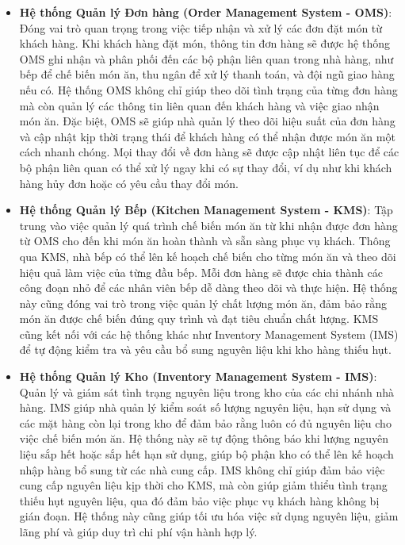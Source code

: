 \begin{itemize}
    \item \textbf{Hệ thống Quản lý Đơn hàng (Order Management System - OMS)}: Đóng vai trò quan trọng trong việc tiếp nhận và xử lý các đơn đặt món từ khách hàng. Khi khách hàng đặt món, thông tin đơn hàng sẽ được hệ thống OMS ghi nhận và phân phối đến các bộ phận liên quan trong nhà hàng, như bếp để chế biến món ăn, thu ngân để xử lý thanh toán, và đội ngũ giao hàng nếu có. Hệ thống OMS không chỉ giúp theo dõi tình trạng của từng đơn hàng mà còn quản lý các thông tin liên quan đến khách hàng và việc giao nhận món ăn. Đặc biệt, OMS sẽ giúp nhà quản lý theo dõi hiệu suất của đơn hàng và cập nhật kịp thời trạng thái để khách hàng có thể nhận được món ăn một cách nhanh chóng. Mọi thay đổi về đơn hàng sẽ được cập nhật liên tục để các bộ phận liên quan có thể xử lý ngay khi có sự thay đổi, ví dụ như khi khách hàng hủy đơn hoặc có yêu cầu thay đổi món.

    \item \textbf{Hệ thống Quản lý Bếp (Kitchen Management System - KMS)}: Tập trung vào việc quản lý quá trình chế biến món ăn từ khi nhận được đơn hàng từ OMS cho đến khi món ăn hoàn thành và sẵn sàng phục vụ khách. Thông qua KMS, nhà bếp có thể lên kế hoạch chế biến cho từng món ăn và theo dõi hiệu quả làm việc của từng đầu bếp. Mỗi đơn hàng sẽ được chia thành các công đoạn nhỏ để các nhân viên bếp dễ dàng theo dõi và thực hiện. Hệ thống này cũng đóng vai trò trong việc quản lý chất lượng món ăn, đảm bảo rằng món ăn được chế biến đúng quy trình và đạt tiêu chuẩn chất lượng. KMS cũng kết nối với các hệ thống khác như Inventory Management System (IMS) để tự động kiểm tra và yêu cầu bổ sung nguyên liệu khi kho hàng thiếu hụt.

    \item \textbf{Hệ thống Quản lý Kho (Inventory Management System - IMS)}: Quản lý và giám sát tình trạng nguyên liệu trong kho của các chi nhánh nhà hàng. IMS giúp nhà quản lý kiểm soát số lượng nguyên liệu, hạn sử dụng và các mặt hàng còn lại trong kho để đảm bảo rằng luôn có đủ nguyên liệu cho việc chế biến món ăn. Hệ thống này sẽ tự động thông báo khi lượng nguyên liệu sắp hết hoặc sắp hết hạn sử dụng, giúp bộ phận kho có thể lên kế hoạch nhập hàng bổ sung từ các nhà cung cấp. IMS không chỉ giúp đảm bảo việc cung cấp nguyên liệu kịp thời cho KMS, mà còn giúp giảm thiểu tình trạng thiếu hụt nguyên liệu, qua đó đảm bảo việc phục vụ khách hàng không bị gián đoạn. Hệ thống này cũng giúp tối ưu hóa việc sử dụng nguyên liệu, giảm lãng phí và giúp duy trì chi phí vận hành hợp lý.


\end{itemize}
